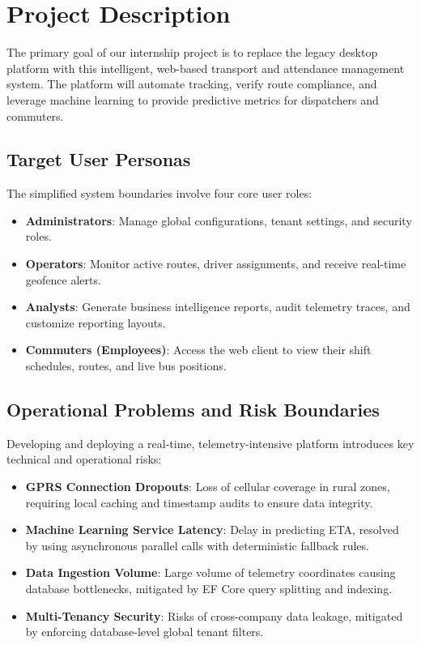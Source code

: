 \section{Project Description}
The primary goal of our internship project is to replace the legacy desktop platform with this intelligent, web-based transport and attendance management system. The platform will automate tracking, verify route compliance, and leverage machine learning to provide predictive metrics for dispatchers and commuters.

\subsection{Target User Personas}
The simplified system boundaries involve four core user roles:
\begin{itemize}
  \item \textbf{Administrators}: Manage global configurations, tenant settings, and security roles.
  \item \textbf{Operators}: Monitor active routes, driver assignments, and receive real-time geofence alerts.
  \item \textbf{Analysts}: Generate business intelligence reports, audit telemetry traces, and customize reporting layouts.
  \item \textbf{Commuters (Employees)}: Access the web client to view their shift schedules, routes, and live bus positions.
\end{itemize}

\subsection{Operational Problems and Risk Boundaries}
Developing and deploying a real-time, telemetry-intensive platform introduces key technical and operational risks:
\begin{itemize}
  \item \textbf{GPRS Connection Dropouts}: Loss of cellular coverage in rural zones, requiring local caching and timestamp audits to ensure data integrity.
  \item \textbf{Machine Learning Service Latency}: Delay in predicting ETA, resolved by using asynchronous parallel calls with deterministic fallback rules.
  \item \textbf{Data Ingestion Volume}: Large volume of telemetry coordinates causing database bottlenecks, mitigated by EF Core query splitting and indexing.
  \item \textbf{Multi-Tenancy Security}: Risks of cross-company data leakage, mitigated by enforcing database-level global tenant filters.
\end{itemize}

